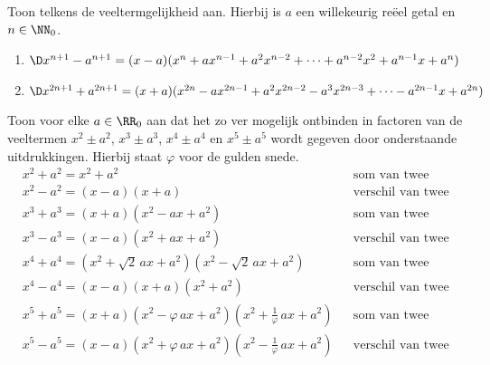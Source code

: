 \documentclass{ximera}
\begin{document}
\begin{Uitbreiding}
\begin{Oefening}
Toon telkens de veeltermgelijkheid aan. Hierbij is $a$ een willekeurig re\"eel getal en $n \in \NN_0$.
\begin{enumerate}

\item
$\D x^{n+1} - a^{n+1} = (x-a)(x^{n} + ax^{n-1} + a^2x^{n-2} + \dots + a^{n-2}x^2 + a^{n-1}x + a^{n})$
\item
$\D x^{2n+1} + a^{2n+1} = (x+a)(x^{2n} - ax^{2n-1} + a^2x^{2n-2} - a^3x^{2n-3} + \dots - a^{2n-1}x + a^{2n})$
\end{enumerate}
\end{Oefening}

\begin{Oefening}
\label{somtweevierdemachten}
Toon voor elke $a \in \RR_0$ aan dat het zo ver mogelijk ontbinden in factoren van de veeltermen $x^2 \pm a^2$, $x^3 \pm a^3$, $x^4 \pm a^4$ en  $x^5 \pm a^5$ wordt gegeven door onderstaande uitdrukkingen. Hierbij staat $\varphi$ voor de gulden snede. %
\begin{align*}
& x^2 + a^2 = x^2 + a^2 && \text{som van twee kwadraten} \\
& x^2 - a^2 = (x-a)(x+a) && \text{verschil van twee kwadraten} \\
& x^3 + a^3 = (x+a)(x^2 - ax + a^2) && \text{som van twee derde machten} \\
& x^3 - a^3 = (x-a)(x^2 + ax + a^2) && \text{verschil van twee derde machten} \\
& x^4 + a^4 = (x^2 + \sqrt{2}\,ax + a^2)(x^2 - \sqrt{2}\,ax + a^2) && \text{som van twee vierde machten} \\
& x^4 - a^4 = (x-a)(x+a)(x^2+a^2) && \text{verschil van twee vierde machten} \\
& x^5 + a^5 = (x+a)(x^2-\varphi\,ax + a^2)(x^2+\frac{1}{\varphi}\,ax + a^2) && \text{som van twee vijfde machten} \\
& x^5 - a^5 = (x-a)(x^2+\varphi\,ax + a^2)(x^2-\frac{1}{\varphi}\,ax + a^2) && \text{verschil van twee vijfde machten}
\end{align*}
\end{Oefening}


\end{Uitbreiding}
\end{document}
